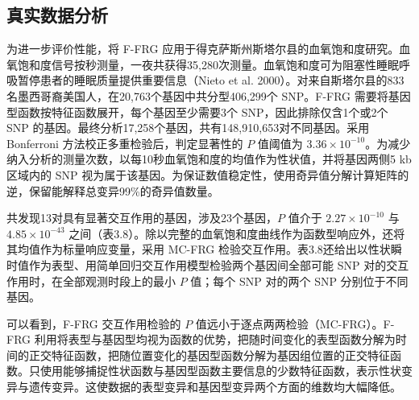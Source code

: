 \subsection{真实数据分析}

为进一步评价性能，将 F-FRG 应用于得克萨斯州斯塔尔县的血氧饱和度研究。血氧饱和度信号按秒测量，一夜共获得35,280次测量。血氧饱和度可为阻塞性睡眠呼吸暂停患者的睡眠质量提供重要信息（Nieto et al. 2000）。对来自斯塔尔县的833名墨西哥裔美国人，在20,763个基因中共分型406,299个 SNP。F-FRG 需要将基因型函数按特征函数展开，每个基因至少需要3个 SNP，因此排除仅含1个或2个 SNP 的基因。最终分析17,258个基因，共有148,910,653对不同基因。采用 Bonferroni 方法校正多重检验后，判定显著性的 $P$ 值阈值为 $3.36\times10^{-10}$。为减少纳入分析的测量次数，以每10秒血氧饱和度的均值作为性状值，并将基因两侧5 kb 区域内的 SNP 视为属于该基因。为保证数值稳定性，使用奇异值分解计算矩阵的逆，保留能解释总变异99\%的奇异值数量。

共发现13对具有显著交互作用的基因，涉及23个基因，$P$ 值介于 $2.27\times10^{-10}$ 与 $4.85\times10^{-43}$ 之间（表3.8）。除以完整的血氧饱和度曲线作为函数型响应外，还将其均值作为标量响应变量，采用 MC-FRG 检验交互作用。表3.8还给出以性状瞬时值作为表型、用简单回归交互作用模型检验两个基因间全部可能 SNP 对的交互作用时，在全部观测时段上的最小 $P$ 值；每个 SNP 对的两个 SNP 分别位于不同基因。



可以看到，F-FRG 交互作用检验的 $P$ 值远小于逐点两两检验（MC-FRG）。F-FRG 利用将表型与基因型均视为函数的优势，把随时间变化的表型函数分解为时间的正交特征函数，把随位置变化的基因型函数分解为基因组位置的正交特征函数。只使用能够捕捉性状函数与基因型函数主要信息的少数特征函数，表示性状变异与遗传变异。这使数据的表型变异和基因型变异两个方面的维数均大幅降低。
\FloatBarrier
